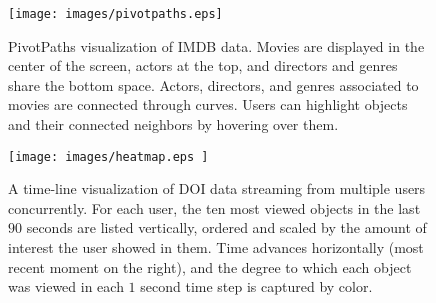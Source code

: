\begin{figure}[htb]
  \centering
  \texttt{[image: images/pivotpaths.eps]}
  \caption{PivotPaths visualization of IMDB data. Movies are displayed in the center of the screen, actors at the top, and directors and genres share the bottom space. Actors, directors, and genres associated to movies are connected through curves. Users can highlight objects and their connected neighbors by hovering over them.}
	\label{fig:pivotpaths}
\end{figure}

\begin{figure}[htb]
  \centering
  \texttt{[image: images/heatmap.eps ]}
  \caption{A time-line visualization of DOI data streaming from multiple users concurrently. For each user, the ten most viewed objects in the last $90$ seconds are listed vertically, ordered and scaled by the amount of interest the user showed in them. Time advances horizontally (most recent moment on the right), and the degree to which each object was viewed in each $1$ second time step is captured by color.}
	\label{fig:heatmap}
\end{figure}


